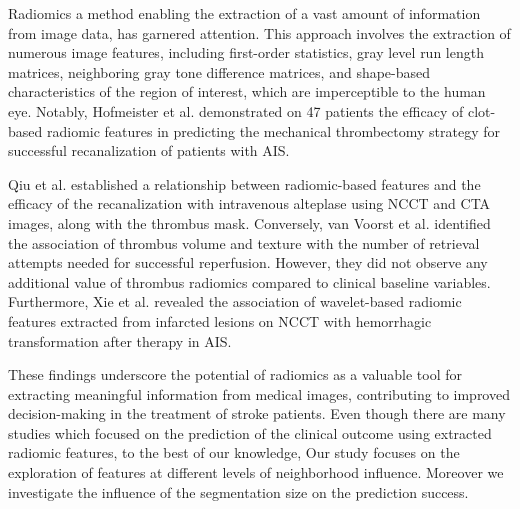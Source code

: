 \documentclass[preprint,12pt]{elsarticle}
\begin{document}
Radiomics  a method enabling the extraction of a vast amount of information from image data, has garnered attention. This approach involves the extraction of numerous image features, including first-order statistics, gray level run length matrices, neighboring gray tone difference matrices, and shape-based characteristics of the region of interest, which are imperceptible to the human eye. Notably, Hofmeister et al. \cite{Hofmeister2020} demonstrated on 47 patients the efficacy of clot-based radiomic features in predicting the mechanical thrombectomy strategy for successful recanalization of patients with AIS.


Qiu et al. \cite{Qiu2018} established a relationship between radiomic-based features and the efficacy of the recanalization with intravenous alteplase using NCCT and CTA images, along with the thrombus mask. Conversely, van Voorst et al. \cite{vanVoorst2022} identified the association of thrombus volume and texture with the number of retrieval attempts needed for successful reperfusion. However, they did not observe any additional value of thrombus radiomics compared to clinical baseline variables. Furthermore, Xie et al. \cite{Xie2022} revealed the association of wavelet-based radiomic features extracted from infarcted lesions on NCCT with hemorrhagic transformation after therapy in AIS. 

These findings underscore the potential of radiomics as a valuable tool for extracting meaningful information from medical images, contributing to improved decision-making in the treatment of stroke patients. Even though there are many studies which focused on the prediction of the clinical outcome using extracted radiomic features, to the best of our knowledge,  Our study focuses on the exploration of features at different levels of neighborhood influence. Moreover we investigate the influence of the segmentation size on the prediction success.




\end{document}
